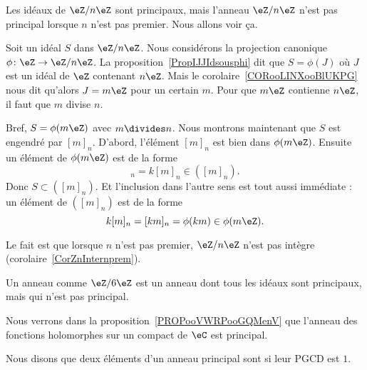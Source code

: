 \begin{example}       \label{EXooCJRPooYkWdyr}

	Les idéaux de \( \eZ/n\eZ\) sont principaux, mais l'anneau \( \eZ/n\eZ\) n'est pas principal lorsque \( n\) n'est pas premier. Nous allons voir ça.

	\begin{subproof}
		Soit un idéal \( S\) dans \( \eZ/n\eZ\). Nous considérons la projection canonique \( \phi\colon \eZ\to \eZ/n\eZ\). La proposition~\ref{PropIJJIdsousphi} dit que  \( S=\phi(J)\) où \( J\) est un idéal de \( \eZ\) contenant \( n\eZ\). Mais le corolaire~\ref{CORooLINXooBlUKPG} nous dit qu'alors \( J=m\eZ\) pour un certain \( m\). Pour que \( m\eZ\) contienne \( n\eZ\), il faut que \( m\) divise \( n\).

		Bref, \( S=\phi(m\eZ)\) avec \( m\divides n\). Nous montrons maintenant que \( S\) est engendré par \( [m]_n\). D'abord, l'élément \( [m]_n\) est bien dans \( \phi(m\eZ)\). Ensuite un élément de \( \phi(m\eZ)\) est de la forme
		\begin{equation}
			[km]_n=k[m]_n\in ([m]_n).
		\end{equation}
		Donc \( S\subset ([m]_n)\). Et l'inclusion dans l'autre sens est tout aussi immédiate : un élément de \( ([m]_n)\) est de la forme
		\begin{equation}
			k[m]_n=[km]_n=\phi(km)\in \phi(m\eZ).
		\end{equation}

		Le fait est que lorsque \( n\) n'est pas premier, \( \eZ/n\eZ\) n'est pas intègre (corolaire~\ref{CorZnInternprem}).

		\spitem[Moralité]
		Un anneau comme \( \eZ/6\eZ\) est un anneau dont tous les idéaux sont principaux, mais qui n'est pas principal.
	\end{subproof}
\end{example}

\begin{example}
	Nous verrons dans la proposition~\ref{PROPooVWRPooGQMenV} que l'anneau des fonctions holomorphes sur un compact de \( \eC\) est principal.
\end{example}

\begin{definition}      \label{DEFooXSPFooPumQSy}
	Nous disons que deux éléments d'un anneau principal sont  si leur PGCD est \( 1\).
\end{definition}

